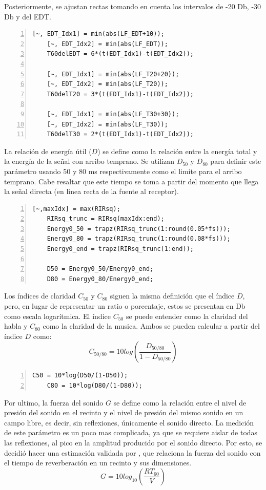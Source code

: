 Posteriormente, se ajustan rectas tomando en cuenta los intervalos de -20 Db, -30 Db y del EDT.
\begin{lstlisting}[frame=single,numbers=left, style=Matlab-editor, basicstyle=\tiny]
    [~, EDT_Idx1] = min(abs(LF_EDT+10));
    [~, EDT_Idx2] = min(abs(LF_EDT));
    T60delEDT = 6*(t(EDT_Idx1)-t(EDT_Idx2));
    
    [~, EDT_Idx1] = min(abs(LF_T20+20));
    [~, EDT_Idx2] = min(abs(LF_T20));
    T60delT20 = 3*(t(EDT_Idx1)-t(EDT_Idx2));
    
    [~, EDT_Idx1] = min(abs(LF_T30+30));
    [~, EDT_Idx2] = min(abs(LF_T30));
    T60delT30 = 2*(t(EDT_Idx1)-t(EDT_Idx2));
\end{lstlisting}
La relación de energía útil ($D$) se define como la relación entre la energía total y la energía de la señal con arribo temprano. Se utilizan $D_{50}$ y $D_{80}$ para definir este parámetro usando 50 y 80 ms respectivamente como el limite para el arribo temprano. Cabe resaltar que este tiempo se toma a partir del momento que llega la señal directa (en linea recta de la fuente al receptor).
\begin{lstlisting}[frame=single,numbers=left, style=Matlab-editor, basicstyle=\tiny]
    [~,maxIdx] = max(RIRsq);
    RIRsq_trunc = RIRsq(maxIdx:end);
    Energy0_50 = trapz(RIRsq_trunc(1:round(0.05*fs)));
    Energy0_80 = trapz(RIRsq_trunc(1:round(0.08*fs)));
    Energy0_end = trapz(RIRsq_trunc(1:end));
    
    D50 = Energy0_50/Energy0_end;
    D80 = Energy0_80/Energy0_end;
\end{lstlisting}
Los índices de claridad $C_{50}$ y $C_{80}$ siguen la misma definición que el índice $D$, pero, en lugar de representar un ratio o porcentaje, estos se presentan en Db como escala logarítmica. El índice $C_{50}$ se puede entender como la claridad del habla y $C_{80}$ como la claridad de la musica. Ambos se pueden calcular a partir del índice $D$ como:
$$C_{50/80} = 10 log \left( \frac{D_{50/80}}{1-D_{50/80}} \right)$$

\begin{lstlisting}[frame=single,numbers=left, style=Matlab-editor, basicstyle=\tiny]
    C50 = 10*log(D50/(1-D50));
    C80 = 10*log(D80/(1-D80));
\end{lstlisting}

Por ultimo, la fuerza del sonido $G$ se define como la relación entre el nivel de presión del sonido en el recinto y el nivel de presión del mismo sonido en un campo libre, es decir, sin reflexiones, únicamente el sonido directo. \hfill\break
La medición de este parámetro es un poco mas complicada, ya que se requiere aislar de todas las reflexiones, al pico en la amplitud producido por el sonido directo. Por esto, se decidió hacer una estimación validada por \cite{Rossing2007}, que relaciona la fuerza del sonido con el tiempo de reverberación en un recinto y sus dimensiones.
$$G = 10 log_{10}\left(\frac{RT_{60}}{V}\right)$$

